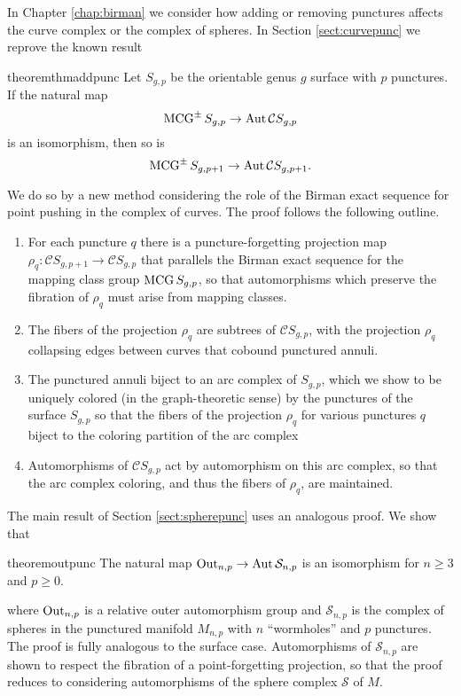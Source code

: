 In Chapter \ref{chap:birman}
we consider how adding or removing punctures affects the curve complex or the complex of spheres.
In Section \ref{sect:curvepunc} we reprove the known result
\begin{restatable}{theorem}{thmaddpunc}
  \label{thm:addpunc}
  Let $S_{g,p}$ be the orientable genus $g$ surface with $p$ punctures.
  If the natural map
  $$
  \operatorname{MCG}^\pm S_{g,p} \to  \operatorname{Aut} \mathcal C S_{g,p}
  $$
  is an isomorphism, then so is
  $$
  \operatorname{MCG}^\pm S_{g,p+1} \to  \operatorname{Aut} \mathcal C S_{g,p+1}.
  $$
\end{restatable}
We do so by a new method considering the role of the Birman exact sequence for point pushing in the complex of curves.
The proof follows the following outline.
\begin{enumerate}
  \item For each puncture $q$ there is a puncture-forgetting projection map $\rho_q: \mathcal C S_{g,p+1} \to \mathcal C S_{g,p}$
  that parallels the Birman exact sequence for the mapping class group $\operatorname{MCG} S_{g,p}$,
  so that automorphisms which preserve the fibration of $\rho_q$ must arise from mapping classes.
  \item The fibers of the projection $\rho_q$ are subtrees of $\mathcal C S_{g,p}$,
  with the projection $\rho_q$ collapsing edges between curves that cobound punctured annuli.
  \item The punctured annuli biject to an arc complex of $S_{g,p}$, which we show to be uniquely colored (in the graph-theoretic sense)
  by the punctures of the surface $S_{g,p}$ so that the fibers of the projection $\rho_q$ for various punctures $q$ biject to the
  coloring partition of the arc complex
  \item Automorphisms of $\mathcal C S_{g,p}$ act by automorphism on this arc complex,
  so that the arc complex coloring, and thus the fibers of $\rho_q$, are maintained.
\end{enumerate}

The main result of Section \ref{sect:spherepunc} uses an analogous proof.
We show that
\begin{restatable}{theorem}{outpunc}
  The natural map
  $\operatorname{Out}_{n,p} \to \operatorname{Aut} \mathcal S_{n,p}$ is an isomorphism for $n\geq 3$ and $p \geq 0$.
\end{restatable}
where $\operatorname{Out}_{n,p}$ is a relative outer automorphism group and $\mathcal S_{n,p}$ is the complex of spheres in
the punctured manifold $M_{n,p}$ with $n$ ``wormholes'' and $p$ punctures.
The proof is fully analogous to the surface case.
Automorphisms of $\mathcal S_{n,p}$ are shown to respect the fibration of a point-forgetting projection,
so that the proof reduces to considering automorphisms of the sphere complex $\mathcal S$ of $M$.

